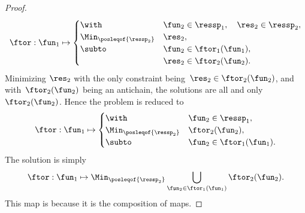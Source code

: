 \begin{proof}
    \begin{equation}
        \ftor:\fun_{1}\mapsto\begin{cases}
            \with                        & \fun_{2}\in\ressp_{1},\quad\res_{2}\in\ressp_{2}, \\
            \Min_{\posleqof{\ressp_{2}}} & \res_{2},                                         \\
            \subto                       & \fun_{2}\in\ftor_{1}(\fun_{1}),                   \\
                                         & \res_{2}\in\ftor_{2}(\fun_{2}).
        \end{cases}\label{eq:dede-2}
    \end{equation}
    Minimizing $\res_{2}$ with the only constraint being~$\res_{2}\in\ftor_{2}(\fun_{2})$, and with~$\ftor_{2}(\fun_{2})$ being an antichain, the solutions are all and only~$\ftor_{2}(\fun_{2})$.
    Hence the problem is reduced to
    \begin{equation}
        \ftor:\fun_{1}\mapsto\begin{cases}
            \with                        & \fun_{2}\in\ressp_{1},          \\
            \Min_{\posleqof{\ressp_{2}}} & \ftor_{2}(\fun_{2}),            \\
            \subto                       & \fun_{2}\in\ftor_{1}(\fun_{1}).
        \end{cases}\label{eq:dede-2-1}
    \end{equation}
    The solution is simply
    \begin{equation}
        \ftor:\fun_{1}\mapsto\Min_{\posleqof{\ressp_{2}}}\bigcup_{\fun_{2}\in\ftor_{1}(\fun_{1})}\ftor_{2}(\fun_{2}).
        \label{eq:ora}
    \end{equation}
    This map is \scottcontinuous because it is the composition of \scottcontinuous maps.
\end{proof}


